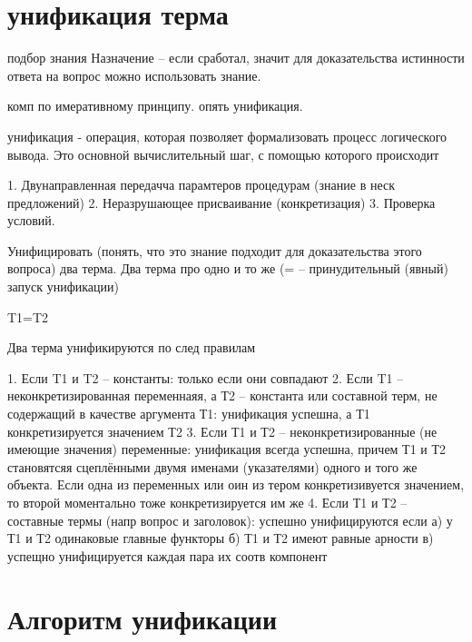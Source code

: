 \documentclass[12pt]{report}
\begin{document}
\section*{унификация терма}

подбор  знания
Назначение -- если сработал, значит для доказательства истинности ответа на вопрос можно использовать знание.

комп по имеративному принципу. опять унификация.


унификация - операция, которая позволяет формализовать процесс логического вывода. Это основной вычислительный шаг, с помощью которого происходит

1. Двунаправленная передачча парамтеров процедурам (знание в неск предложений)
2. Неразрушающее присваивание (конкретизация) 
3. Проверка условий.


Унифицировать (понять, что это знание подходит для доказательства этого вопроса) два терма. Два терма про одно и то же (= -- принудительный (явный) запуск  унификации)

T1=T2


Два терма унификируются по след правилам 

1. Если T1 и T2 -- константы: только если они совпадают
2. Если T1 -- неконкретизированная переменнаяя, а Т2 -- константа или составной терм, не содержащий в качестве аргумента Т1: унификация успешна, а Т1 конкретизируется значением Т2
3. Если Т1 и Т2 -- неконкретизированные (не имеющие значения) переменные: унификация всегда успешна, причем Т1 и Т2 становятсяя сцеплёнными двумя именами (указателями) одного и того же объекта.
Если одна из переменных или оин из тером конкретизивуется значением, то второй моментально тоже конкретизируется им же
4. Если Т1 и Т2 -- составные термы (напр вопрос и заголовок): успешно унифицируются если
а) у Т1 и Т2 одинаковые главные функторы
б) Т1 и Т2 имеют равные арности
в) успещно унифицируется каждая пара их  соотв компонент

\section*{Алгоритм унификации}
\end{document}

